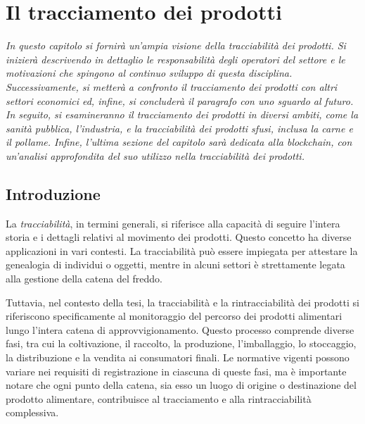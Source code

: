\chapter{Il tracciamento dei prodotti}

\begin{preamble}
{\em 
In questo capitolo si fornirà un'ampia visione della tracciabilità dei prodotti. Si inizierà descrivendo in dettaglio le responsabilità degli operatori del settore e le motivazioni che spingono al continuo sviluppo di questa disciplina. Successivamente, si metterà a confronto il tracciamento dei prodotti con altri settori economici ed, infine, si concluderà il paragrafo con uno sguardo al futuro. \newline \indent In seguito, si esamineranno il tracciamento dei prodotti in diversi ambiti, come la sanità pubblica, l'industria, e la tracciabilità dei prodotti sfusi, inclusa la carne e il pollame. \newline \indent Infine, l'ultima sezione del capitolo sarà dedicata alla blockchain, con un'analisi approfondita del suo utilizzo nella tracciabilità dei prodotti.
}
\end{preamble}

\section{Introduzione}

La \textit{tracciabilità}, in termini generali, si riferisce alla capacità di seguire l'intera storia e i dettagli relativi al movimento dei prodotti. Questo concetto ha diverse applicazioni in vari contesti. La tracciabilità può essere impiegata per attestare la genealogia di individui o oggetti, mentre in alcuni settori è strettamente legata alla gestione della catena del freddo.

Tuttavia, nel contesto della tesi, la tracciabilità e la rintracciabilità dei prodotti si riferiscono specificamente al monitoraggio del percorso dei prodotti alimentari lungo l'intera catena di approvvigionamento. Questo processo comprende diverse fasi, tra cui la coltivazione, il raccolto, la produzione, l'imballaggio, lo stoccaggio, la distribuzione e la vendita ai consumatori finali. Le normative vigenti possono variare nei requisiti di registrazione in ciascuna di queste fasi, ma è importante notare che ogni punto della catena, sia esso un luogo di origine o destinazione del prodotto alimentare, contribuisce al tracciamento e alla rintracciabilità complessiva.

